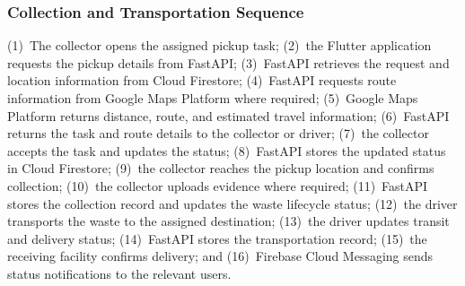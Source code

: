 \subsubsection{Collection and Transportation Sequence}
(1)~The collector opens the assigned pickup task; (2)~the Flutter application
requests the pickup details from FastAPI; (3)~FastAPI retrieves the request
and location information from Cloud Firestore; (4)~FastAPI requests route
information from Google Maps Platform where required; (5)~Google Maps
Platform returns distance, route, and estimated travel information; (6)~FastAPI
returns the task and route details to the collector or driver; (7)~the collector
accepts the task and updates the status; (8)~FastAPI stores the updated status
in Cloud Firestore; (9)~the collector reaches the pickup location and confirms
collection; (10)~the collector uploads evidence where required; (11)~FastAPI
stores the collection record and updates the waste lifecycle status; (12)~the
driver transports the waste to the assigned destination; (13)~the driver
updates transit and delivery status; (14)~FastAPI stores the transportation
record; (15)~the receiving facility confirms delivery; and (16)~Firebase Cloud
Messaging sends status notifications to the relevant users.

